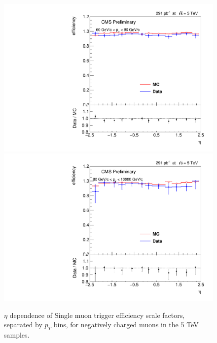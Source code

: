 \begin{figure}
\includegraphics[width=0.45\linewidth]{plots/efficiency/5_zmmhlt_negative/PtBins_eta_pt10.pdf}
\includegraphics[width=0.45\linewidth]{plots/efficiency/5_zmmhlt_negative/PtBins_eta_pt11.pdf}
\caption{$\eta$ dependence of Single muon trigger efficiency scale factors, separated by $p_T$ bins, for negatively charged muons in the 5 TeV samples.}
\label{fig:Eff:mu:5:HLT:neg}
\end{figure}
